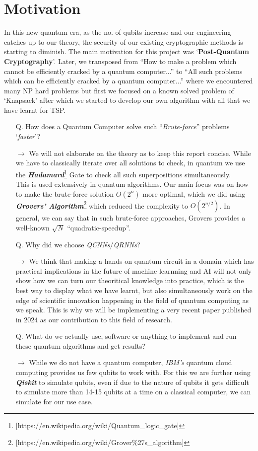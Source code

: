 \documentclass[a4paper]{article}
\begin{document}
\section*{Motivation}
In this new quantum era, as the no. of qubits increase and our engineering catches up to our theory, the security of our existing cryptographic methods is starting to diminish. The main motivation for this project was `\textbf{Post-Quantum Cryptography}'. Later, we transposed from ``How to make a problem which cannot be efficiently cracked by a quantum computer...'' to ``All such problems which can be efficiently cracked by a quantum computer...'' where we encountered many NP hard problems but first we focused on a known solved problem of `Knapsack' after which we started to develop our own algorithm with all that we have learnt for TSP.
\begin{itemize}
\item[Q.] How does a Quantum Computer solve such ``\emph{Brute-force}'' problems `\emph{faster}'?
\item[\textbf{$\rightarrow$}] We will not elaborate on the theory as to keep this report concise. While we have to classically iterate over all solutions to check, in quantum we use the \textbf{\emph{Hadamard}}\footnote{[https://en.wikipedia.org/wiki/Quantum\_logic\_gate]} Gate to check all such superpositions simultaneously.\vspace{5pt}\\
This is used extensively in quantum algorithms. Our main focus was on how to make the brute-force solution $O(2^{n})$ more optimal, which we did using \emph{\textbf{Grovers' Algorithm}}\footnote{[https://en.wikipedia.org/wiki/Grover\%27s\_algorithm]} which reduced the complexity to $O(2^{n/2})$. In general, we can say that in such brute-force approaches, Grovers provides a well-known $\sqrt{N}$ ``quadratic-speedup''.

\item[Q.] Why did we choose \emph{QCNNs}/\emph{QRNNs}?
\item[\textbf{$\rightarrow$}] We think that making a hands-on quantum circuit in a domain which has practical implications in the future of machine learnning and AI will not only show how we can turn our theoritical knowledge into practice, which is the best way to display what we have learnt, but also simultaneously work on the edge of scientific innovation happening in the field of quantum computing as we speak. This is why we will be implementing a very recent paper published in 2024 as our contribution to this field of research.

\item[Q.] What do we actually use, software or anything to implement and run these quantum algorithms and get results?
\item[\textbf{$\rightarrow$}] While we do not have a quantum computer,  \emph{IBM's} quantum cloud computing provides us few qubits to work with. For this we are further using \textbf{\emph{Qiskit}} to simulate qubits, even if due to the nature of qubits it gets difficult to simulate more than 14-15 qubits at a time on a classical computer, we can simulate for our use case.
\end{itemize}
\end{document}
